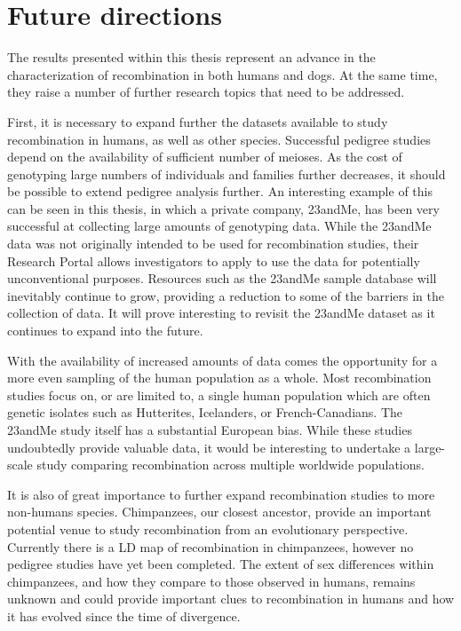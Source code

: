 \section{Future directions}

The results presented within this thesis represent an advance in the characterization of recombination in both humans and dogs.
At the same time, they raise a number of further research topics that need to be addressed.

First, it is necessary to expand further the datasets available to study recombination in humans, as well as other species.
Successful pedigree studies depend on the availability of sufficient number of meioses.
As the cost of genotyping large numbers of individuals and families further decreases, it should be possible to extend pedigree analysis further.
An interesting example of this can be seen in this thesis, in which a private company, 23andMe, has been very successful at collecting large amounts of genotyping data. %
While the 23andMe data was not originally intended to be used for recombination studies, their Research Portal\cite{23andMe2013} allows investigators to apply to use the data for potentially unconventional purposes.
Resources such as the 23andMe sample database will inevitably continue to grow, providing a reduction to some of the barriers in the collection of data.
It will prove interesting to revisit the 23andMe dataset as it continues to expand into the future.

With the availability of increased amounts of data comes the opportunity for a more even sampling of the human population as a whole.
Most recombination studies focus on, or are limited to, a single human population which are often genetic isolates such as Hutterites\cite{Coop2008}, Icelanders\cite{Kong2010}, or French-Canadians\cite{Hussin2011}.
The 23andMe study itself has a substantial European bias.
While these studies undoubtedly provide valuable data, it would be interesting to undertake a large-scale study comparing recombination across multiple worldwide populations.

It is also of great importance to further expand recombination studies to more non-humans species.
Chimpanzees, our closest ancestor, provide an important potential venue to study recombination from an evolutionary perspective.
Currently there is a LD map of recombination in chimpanzees\cite{Auton2012a}, however no pedigree studies have yet been completed.
The extent of sex differences within chimpanzees, and how they compare to those observed in humans, remains unknown and could provide important clues to recombination in humans and how it has evolved since the time of divergence.

